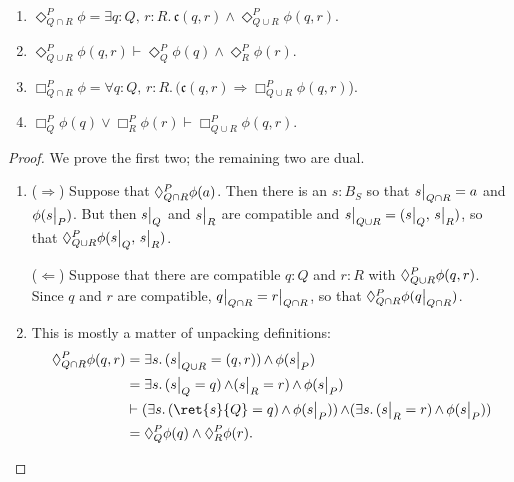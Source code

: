 \begin{prop}
~
\begin{enumerate}
    \item $\Diamond^P_{Q \cap R}\phi = \exists q : Q,\, r : R.\, \mathfrak{c}(q,r) \wedge \Diamond^P_{Q \cup R}\phi(q, r)$.
    \item $\Diamond^P_{Q \cup R} \phi(q, r) \vdash \Diamond^P_Q \phi(q) \wedge \Diamond^P_R \phi(r)$.
    \item $\Box^P_{Q \cap R}\phi = \forall q : Q,\, r : R.\, (\mathfrak{c}(q,r) \Rightarrow \Box^P_{Q \cup R}\phi(q, r)$).
    \item $\Box^P_Q \phi(q) \vee \Box^P_R \phi(r)  \vdash  \Box^P_{Q \cup R} \phi(q, r)$.
\end{enumerate}
\end{prop}
\begin{proof}
We prove the first two; the remaining two are dual.
\begin{enumerate}
    \item ($\Rightarrow$) Suppose that $\compat{P}{Q \cap R}\phi(a)$. Then there is an $s : B_S$ so that $\rest{s}{Q \cap R} = a$ and $\phi(\rest{s}{P})$. But then $\rest{s}{Q}$ and $\rest{s}{R}$ are compatible and $\rest{s}{Q \cup R} = (\rest{s}{Q},\, \rest{s}{R})$, so that $\compat{P}{Q \cup R}\phi(\rest{s}{Q},\, \rest{s}{R})$.
    
    ($\Leftarrow$) Suppose that there are compatible $q : Q$ and $r : R$ with $\compat{P}{Q \cup R}\phi(q, r)$. Since $q$ and $r$ are compatible, $\rest{q}{Q \cap R} = \rest{r}{Q \cap R}$, so that $\compat{P}{Q \cap R}\phi(\rest{q}{Q \cap R})$.
    \item This is mostly a matter of unpacking definitions:
        \begin{align*}
            \compat{P}{Q \cap R}\phi(q, r) &= \exists s.\, (\rest{s}{Q \cup R} = (q, r)) \meet \phi(\rest{s}{P}) \\
                &= \exists s.\, (\rest{s}{Q} = q) \meet (\rest{s}{R} = r) \meet \phi(\rest{s}{P}) \\
                &\vdash (\exists s.\, (\ret{s}{Q} = q) \meet \phi(\rest{s}{P})) \meet (\exists s.\, (\rest{s}{R} = r) \meet \phi(\rest{s}{P})) \\
                &= \compat{P}{Q}\phi(q) \wedge \compat{P}{R}\phi(r). \qedhere
        \end{align*} 
\end{enumerate}
\end{proof}

